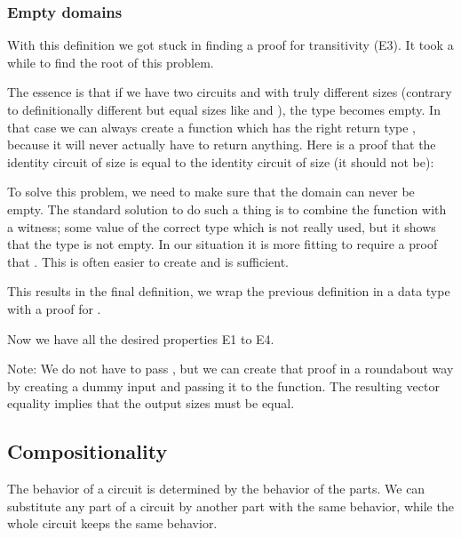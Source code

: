 \subsubsection{Empty domains}\label{empty-domains}

With this definition  we got stuck in finding a proof for
transitivity (E3).
It took a while to find the root of this problem.

The essence is that if we have two circuits  and 
with truly different sizes (contrary to definitionally different but
equal sizes like  \AF{+}  and ), the type
   becomes empty.
In that case we can always create a function which has the right
return type   
   
 , because it will never actually
have to return anything.
Here is a proof that the identity circuit of size  is equal to
the identity circuit of size  (it should not be):


To solve this problem, we need to make sure that the domain can never
be empty.
The standard solution to do such a thing is to combine the function
with a witness; some value of the correct type which is not really
used, but it shows that the type is not empty.
In our situation it is more fitting to require a proof that 
 .
This is often easier to create and is sufficient.

This results in the final definition, we wrap the previous definition
 in a data type with a proof for   .


Now we have all the desired properties E1 to E4.

Note: We do not have to pass   , but we can create
that proof in a roundabout way by creating a dummy input and passing
it to the function.
The resulting vector equality implies that the output sizes must be
equal.

\subsection{Compositionality}\label{compositionality}

The behavior of a circuit is determined by the behavior of the parts. We
can substitute any part of a circuit by another part with the same
behavior, while the whole circuit keeps the same behavior.

